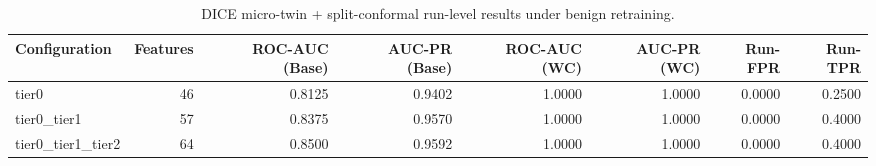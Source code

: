 \begin{table}[t]
\centering
\caption{DICE micro-twin + split-conformal run-level results under benign retraining.}
\label{tab:dice_full_overall}
\footnotesize
\begin{tabular}{lrrrrrrr}
\toprule
Configuration & Features & ROC-AUC (Base) & AUC-PR (Base) & ROC-AUC (WC) & AUC-PR (WC) & Run-FPR & Run-TPR \\
\midrule
tier0 & 46 & 0.8125 & 0.9402 & 1.0000 & 1.0000 & 0.0000 & 0.2500 \\
tier0_tier1 & 57 & 0.8375 & 0.9570 & 1.0000 & 1.0000 & 0.0000 & 0.4000 \\
tier0_tier1_tier2 & 64 & 0.8500 & 0.9592 & 1.0000 & 1.0000 & 0.0000 & 0.4000 \\
\bottomrule
\end{tabular}

\end{table}

